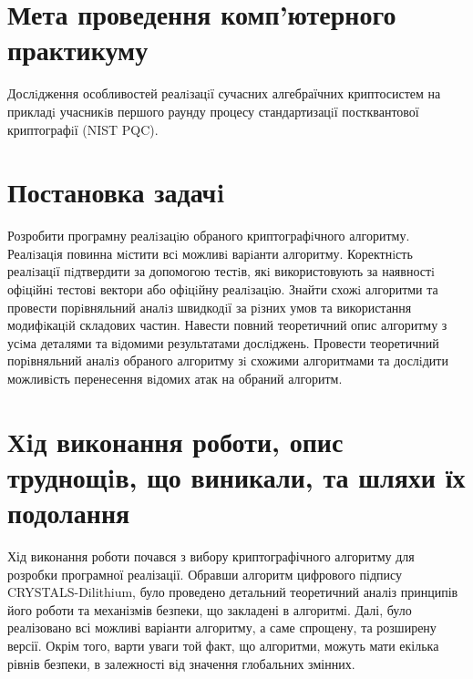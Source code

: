 \documentclass[12pt]{HomusWorkus}
\begin{document}

\addtocounter{page}{1}

\tableofcontents
\newpage


\section{Мета проведення комп’ютерного практикуму}

Дослiдження особливостей реалiзацiї сучасних алгебраїчних криптосистем на прикладi
учасникiв першого раунду процесу стандартизацiї постквантової криптографiї (NIST PQC).

\section{Постановка задачi}

Розробити програмну реалiзацiю обраного криптографiчного алгоритму. Реалiзацiя повинна мiстити всi можливi варiанти алгоритму. Коректнiсть реалiзацiї пiдтвердити за допомогою тестiв, якi використовують за наявностi офiцiйнi тестовi вектори або офiцiйну реалiзацiю. Знайти схожi алгоритми та провести порiвняльний аналiз швидкодiї за рiзних умов та використання модифiкацiй складових частин. Навести повний теоретичний опис алгоритму з усiма деталями та вiдомими результатами дослiджень. Провести теоретичний порiвняльний аналiз обраного алгоритму зi схожими алгоритмами та дослiдити можливiсть перенесення вiдомих атак на обраний алгоритм.

\section{Хiд виконання роботи, опис труднощiв, що виникали, та шляхи їх подолання}

Хід виконання роботи почався з вибору криптографічного алгоритму для розробки програмної реалізації. Обравши алгоритм цифрового підпису CRYSTALS-Dilithium, було проведено детальний теоретичний аналіз принципів його роботи та механізмів безпеки, що закладені в алгоритмі. Далі, було реалізовано всі можливі варіанти алгоритму, а саме спрощену, та розширену версії. Окрім того, варти уваги той факт, що алгоритми, можуть мати екілька рівнів безпеки, в залежності від значення глобальних змінних.
\end{document}
